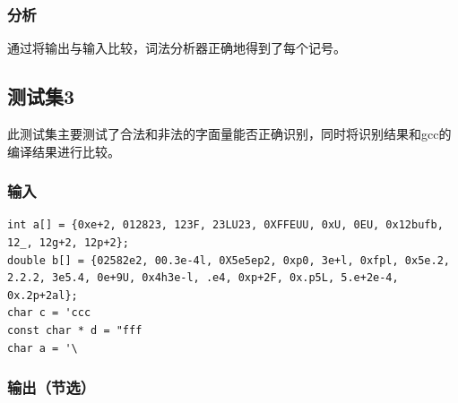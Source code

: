 \documentclass[lang=cn,11pt,a4paper,cite=authornum]{paper}
\begin{document}
\subsubsection{分析}

通过将输出与输入比较，词法分析器正确地得到了每个记号。

\subsection{测试集3}

此测试集主要测试了合法和非法的字面量能否正确识别，同时将识别结果和gcc的编译结果进行比较。

\subsubsection{输入}

\begin{code}
\begin{verbatim}
int a[] = {0xe+2, 012823, 123F, 23LU23, 0XFFEUU, 0xU, 0EU, 0x12bufb, 12_, 12g+2, 12p+2};
double b[] = {02582e2, 00.3e-4l, 0X5e5ep2, 0xp0, 3e+l, 0xfpl, 0x5e.2, 2.2.2, 3e5.4, 0e+9U, 0x4h3e-l, .e4, 0xp+2F, 0x.p5L, 5.e+2e-4, 0x.2p+2al};
char c = 'ccc
const char * d = "fff
char a = '\
\end{verbatim}
\end{code}

\subsubsection{输出（节选）}
\end{document}
